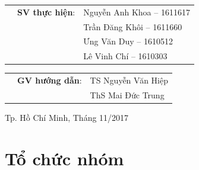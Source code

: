\documentclass[a4paper]{article}
\begin{document}
\begin{titlepage}
\begin{table}[h]
\begin{tabular}{rrl}
\hspace{5cm} & \textbf{SV thực hiện}: & Nguyễn Anh Khoa -- 1611617 \\
& &Trần Đăng Khôi -- 1611660\\
& &Ưng Văn Duy -- 1610512\\
& &Lê Vinh Chí -- 1610303

\end{tabular}
\end{table}
\vspace{-0.2cm}

\begin{table}[h]
\begin{tabular}{rrl}
\hspace{5cm} & \textbf{GV hướng dẫn}: &TS Nguyễn Văn Hiệp \\
& &ThS Mai Đức Trung\\


\end{tabular}
\end{table}
\vspace{1cm}

\begin{center}
{\footnotesize Tp. Hồ Chí Minh, Tháng 11/2017}
\end{center}
\end{titlepage}

\newpage
\thispagestyle{empty}
\tableofcontents

\newpage
\thispagestyle{empty}
\listoftables

\newpage
\thispagestyle{empty}
\listoffigures

\newpage

\section{Tổ chức nhóm}
\end{document}
